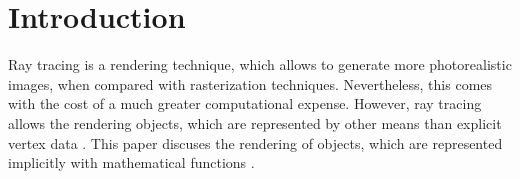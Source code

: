 


\section{Introduction}
\label{section:Introduction}


Ray tracing is a rendering technique, which allows to generate more photorealistic images, when compared with rasterization techniques. Nevertheless, this comes with the cost of a much greater computational expense. However, ray tracing allows the rendering objects, which are represented by other means than explicit vertex data \cite{bungartz:2013:einfuhrung}. This paper discuses the rendering of objects, which are represented implicitly with mathematical functions \cite{osher:2006:level}.  
